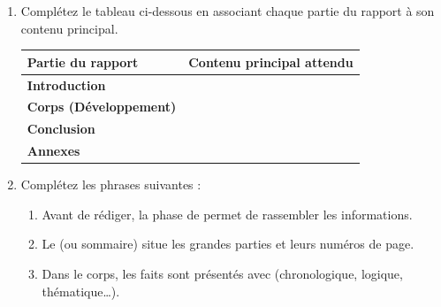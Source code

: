 \documentclass[11pt]{article}
\begin{document}
\begin{exercice}
\begin{enumerate}
    \item Complétez le tableau ci-dessous en associant chaque partie du rapport à son contenu principal.
    
    \begin{tabular}{|>{\bfseries}p{3.5cm}|p{11cm}|}
    \hline
    \textbf{Partie du rapport} & \textbf{Contenu principal attendu} \\ \hline
    Introduction & \dotfill \\ \hline
    Corps (Développement) & \dotfill \\ \hline
    Conclusion & \dotfill \\ \hline
    Annexes & \dotfill \\ \hline
    \end{tabular}
    
    \item Complétez les phrases suivantes :
    \begin{enumerate}
        \item Avant de rédiger, la phase de \underline{\hspace{4cm}} permet de rassembler les informations.
        \item Le \underline{\hspace{4cm}} (ou sommaire) situe les grandes parties et leurs numéros de page.
        \item Dans le corps, les faits sont présentés avec \underline{\hspace{4cm}} (chronologique, logique, thématique\dots).
    \end{enumerate}
\end{enumerate}
\end{exercice}
\end{document}
